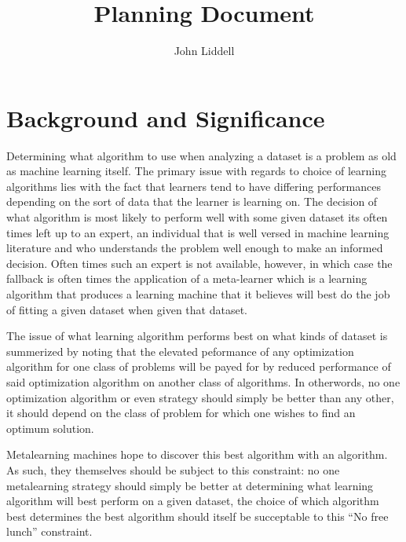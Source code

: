 \documentclass[a4paper,11pt]{article}
\date{}
\newcommand{\email}[1]{\texttt{\small #1}}
\begin{document}
	\title{Planning Document
	}

\author{John Liddell}
\affil{ \email{jl0000285@gmail.com}}



\maketitle

\section{Background and Significance}
  Determining what algorithm to use when analyzing a dataset is a problem as old
  as machine learning itself. The primary issue with regards to choice of learning
  algorithms lies with the fact that learners tend to have differing performances
  depending on the sort of data that the learner is learning on. The decision
  of what algorithm is most likely to perform well with some given dataset its often
  times left up to an expert,  an individual that is well versed in machine learning
  literature and who understands the problem well enough to make an informed decision.
  Often times such an expert is not available, however, in which case the fallback is
  often times the application of a meta-learner which is a learning algorithm that
  produces a learning machine that it believes will best do the job of fitting a given
  dataset when given that dataset.

  The issue of what learning algorithm performs best on what kinds of dataset is
  summerized by noting that the elevated peformance of any optimization algorithm for one class of
  problems will be payed for by reduced performance of said optimization algorithm on  another class
  of algorithms. \cite{Wolpert} In otherwords, no one optimization algorithm or even strategy should
  simply be better than any other, it should depend on the class of problem for which one wishes to find
  an optimum solution.

  Metalearning machines hope to discover this best algorithm with an algorithm. As such, they themselves
  should be subject to this constraint: no one metalearning strategy should simply be better at determining
  what learning algorithm will best perform on a given dataset, the choice of which algorithm best
  determines the best algorithm should itself be succeptable to this ``No free lunch'' constraint.
\end{document}
